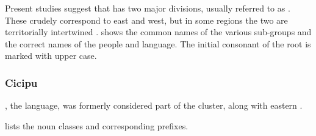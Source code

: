 \documentclass[output=paper]{langsci/langscibook}
\begin{document}
Present studies suggest that  has two major divisions, usually referred to as . These crudely correspond to east and west, but in some regions the two are territorially intertwined \citep{Blench1982}.  shows the common names of the various  sub-groups and the correct names of the people and language. The initial consonant of the root is marked with upper case.

\newpage  
\subsubsection{Cicipu}

, the  language, was formerly considered part of the  cluster, along with eastern . 

  
 lists the  noun classes and corresponding prefixes.
\end{document}
